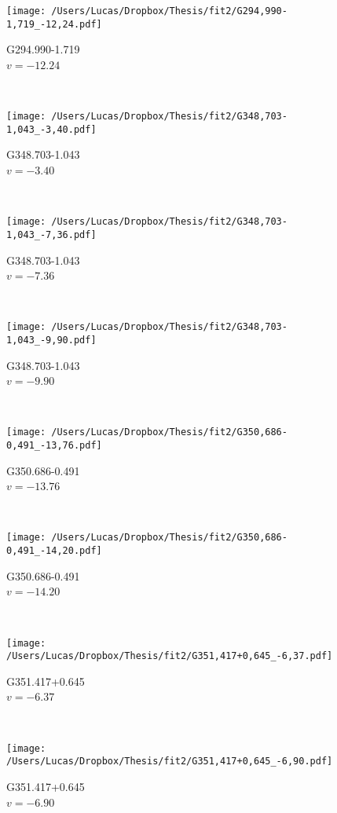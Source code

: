 \begin{figure*}[t]\ContinuedFloat
	\centering
	\begin{subfigure}[t]{0.3\textwidth}
		\texttt{[image: /Users/Lucas/Dropbox/Thesis/fit2/G294,990-1,719\_-12,24.pdf]}
		\caption[]{G294.990-1.719\\$v=-12.24$\,\kms}
	\end{subfigure}
	~
	\begin{subfigure}[t]{0.3\textwidth}
		\texttt{[image: /Users/Lucas/Dropbox/Thesis/fit2/G348,703-1,043\_-3,40.pdf]}
		\caption[]{G348.703-1.043\\$v=-3.40$\,\kms}
	\end{subfigure}
	~
	\begin{subfigure}[t]{0.3\textwidth}
		\texttt{[image: /Users/Lucas/Dropbox/Thesis/fit2/G348,703-1,043\_-7,36.pdf]}
		\caption[]{G348.703-1.043\\$v=-7.36$\,\kms}
	\end{subfigure}
	~
	\begin{subfigure}[t]{0.3\textwidth}
		\texttt{[image: /Users/Lucas/Dropbox/Thesis/fit2/G348,703-1,043\_-9,90.pdf]}
		\caption[]{G348.703-1.043\\$v=-9.90$\,\kms}
	\end{subfigure}
	~
	\begin{subfigure}[t]{0.3\textwidth}
		\texttt{[image: /Users/Lucas/Dropbox/Thesis/fit2/G350,686-0,491\_-13,76.pdf]}
		\caption[]{G350.686-0.491\\$v=-13.76$\,\kms}
	\end{subfigure}
	~
	\begin{subfigure}[t]{0.3\textwidth}
		\texttt{[image: /Users/Lucas/Dropbox/Thesis/fit2/G350,686-0,491\_-14,20.pdf]}
		\caption[]{G350.686-0.491\\$v=-14.20$\,\kms}
	\end{subfigure}
	~
	\begin{subfigure}[t]{0.3\textwidth}
		\texttt{[image: /Users/Lucas/Dropbox/Thesis/fit2/G351,417+0,645\_-6,37.pdf]}
		\caption[]{G351.417+0.645\\$v=-6.37$\,\kms}
	\end{subfigure}
	~
	\begin{subfigure}[t]{0.3\textwidth}
		\texttt{[image: /Users/Lucas/Dropbox/Thesis/fit2/G351,417+0,645\_-6,90.pdf]}
		\caption[]{G351.417+0.645\\$v=-6.90$\,\kms}

\end{subfigure}
\end{figure*}
